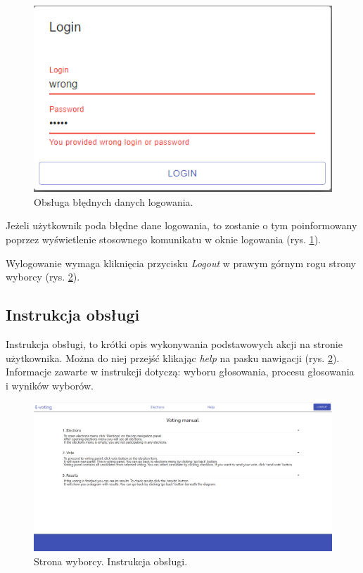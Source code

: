\documentclass[a4paper,12pt]{book}
\begin{document}
\begin{figure}[h]
	\centering
	\includegraphics{images/errorlogin.png}
	\caption{Obsługa błędnych danych logowania.}\label{wronglogin}
\end {figure}

Jeżeli użytkownik poda błędne dane logowania, to zostanie o tym poinformowany poprzez wyświetlenie stosownego komunikatu w oknie logowania (rys. \ref{wronglogin}). 

\newpage

Wylogowanie wymaga kliknięcia przycisku \textit{Logout} w prawym górnym rogu strony wyborcy (rys. \ref{manual}).

\subsection{Instrukcja obsługi}

Instrukcja obsługi, to krótki opis wykonywania podstawowych akcji na stronie użytkownika. Można do niej przejść klikając \textit{help} na pasku nawigacji (rys. \ref{manual}). Informacje zawarte w instrukcji dotyczą: wyboru głosowania, procesu głosowania i wyników wyborów.

\begin{figure}[H]
	\centering
	\includegraphics[width=\textwidth]{images/manual.png}
	\caption{Strona wyborcy. Instrukcja obsługi.}\label{manual}
\end {figure}
\end{document}
